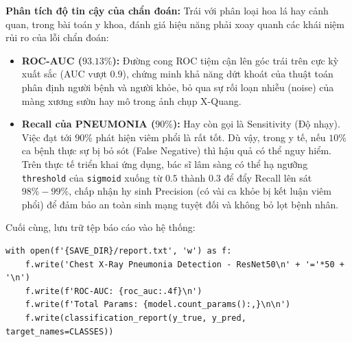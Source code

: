 \textbf{Phân tích độ tin cậy của chẩn đoán:}
Trái với phân loại hoa lá hay cảnh quan, trong bài toán y khoa, đánh giá hiệu năng phải xoay quanh các khái niệm rủi ro của lỗi chẩn đoán:
\begin{itemize}
    \item \textbf{ROC-AUC ($93.13\%$):} Đường cong ROC tiệm cận lên góc trái trên cực kỳ xuất sắc (AUC vượt $0.9$), chứng minh khả năng dứt khoát của thuật toán phân định người bệnh và người khỏe, bỏ qua sự rối loạn nhiễu (noise) của màng xương sườn hay mô trong ảnh chụp X-Quang.
    \item \textbf{Recall của PNEUMONIA ($90\%$):} Hay còn gọi là Sensitivity (Độ nhạy). Việc đạt tới $90\%$ phát hiện viêm phổi là rất tốt. Dù vậy, trong y tế, nếu $10\%$ ca bệnh thực sự bị bỏ sót (False Negative) thì hậu quả có thể nguy hiểm. Trên thực tế triển khai ứng dụng, bác sĩ lâm sàng có thể hạ ngưỡng \texttt{threshold} của \texttt{sigmoid} xuống từ $0.5$ thành $0.3$ để đẩy Recall lên sát $98\% - 99\%$, chấp nhận hy sinh Precision (có vài ca khỏe bị kết luận viêm phổi) để đảm bảo an toàn sinh mạng tuyệt đối và không bỏ lọt bệnh nhân.
\end{itemize}

Cuối cùng, lưu trữ tệp báo cáo vào hệ thống:
\begin{lstlisting}[style=pythoncode, caption={Lưu báo cáo vào tập tin hệ thống}]
with open(f'{SAVE_DIR}/report.txt', 'w') as f:
    f.write('Chest X-Ray Pneumonia Detection - ResNet50\n' + '='*50 + '\n')
    f.write(f'ROC-AUC: {roc_auc:.4f}\n')
    f.write(f'Total Params: {model.count_params():,}\n\n')
    f.write(classification_report(y_true, y_pred, target_names=CLASSES))
\end{lstlisting}
